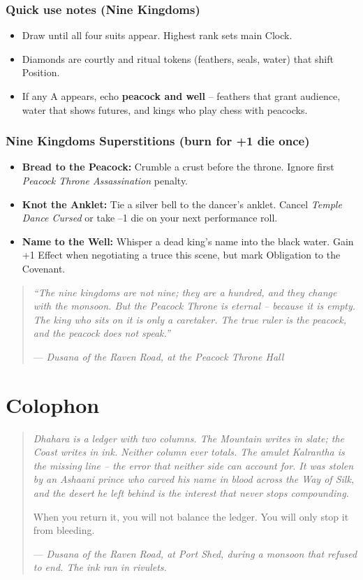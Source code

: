 \documentclass[11pt]{book}
\newenvironment{lorebox}{\begin{quote}\small\itshape}{\end{quote}}
\begin{document}
\subsection*{Quick use notes (Nine Kingdoms)}
\begin{itemize}
\item Draw until all four suits appear. Highest rank sets main Clock.
\item Diamonds are courtly and ritual tokens (feathers, seals, water) that shift Position.
\item If any A appears, echo \textbf{peacock and well} – feathers that grant audience, water that shows futures, and kings who play chess with peacocks.
\end{itemize}

\subsection*{Nine Kingdoms Superstitions (burn for +1 die once)}
\begin{itemize}
\item \textbf{Bread to the Peacock:} Crumble a crust before the throne. Ignore first \textit{Peacock Throne Assassination} penalty.
\item \textbf{Knot the Anklet:} Tie a silver bell to the dancer’s anklet. Cancel \textit{Temple Dance Cursed} or take –1 die on your next performance roll.
\item \textbf{Name to the Well:} Whisper a dead king’s name into the black water. Gain +1 Effect when negotiating a truce this scene, but mark Obligation to the Covenant.
\end{itemize}

\begin{lorebox}
“The nine kingdoms are not nine; they are a hundred, and they change with the monsoon. But the Peacock Throne is eternal – because it is empty. The king who sits on it is only a caretaker. The true ruler is the peacock, and the peacock does not speak.”

--- \textit{Dusana of the Raven Road, at the Peacock Throne Hall}
\end{lorebox}

\clearpage
\chapter*{Colophon}

\vspace{2\baselineskip}
\begin{lorebox}
Dhahara is a ledger with two columns. The Mountain writes in slate; the Coast writes in ink. Neither column ever totals. The amulet Kalrantha is the missing line -- the error that neither side can account for. It was stolen by an Ashaani prince who carved his name in blood across the Way of Silk, and the desert he left behind is the interest that never stops compounding.

When you return it, you will not balance the ledger. You will only stop it from bleeding.

--- \textit{Dusana of the Raven Road, at Port Shed, during a monsoon that refused to end. The ink ran in rivulets.}
\end{lorebox}
\end{document}
